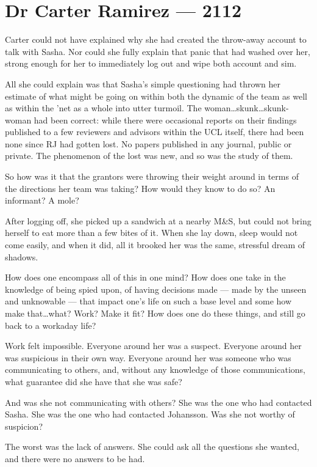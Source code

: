 \hypertarget{dr-carter-ramirez-2112}{%
\chapter*{Dr Carter Ramirez — 2112}\label{dr-carter-ramirez-2112}}

Carter could not have explained why she had created the throw-away account to talk with Sasha. Nor could she fully explain that panic that had washed over her, strong enough for her to immediately log out and wipe both account and sim.

All she could explain was that Sasha's simple questioning had thrown her estimate of what might be going on within both the dynamic of the team as well as within the 'net as a whole into utter turmoil. The woman\ldots{}skunk\ldots{}skunk-woman had been correct: while there were occasional reports on their findings published to a few reviewers and advisors within the UCL itself, there had been none since RJ had gotten lost. No papers published in any journal, public or private. The phenomenon of the lost was new, and so was the study of them.

So how was it that the grantors were throwing their weight around in terms of the directions her team was taking? How would they know to do so? An informant? A mole?

After logging off, she picked up a sandwich at a nearby M\&S, but could not bring herself to eat more than a few bites of it. When she lay down, sleep would not come easily, and when it did, all it brooked her was the same, stressful dream of shadows.

How does one encompass all of this in one mind? How does one take in the knowledge of being spied upon, of having decisions made — made by the unseen and unknowable — that impact one's life on such a base level and some how make that\ldots{}what? Work? Make it fit? How does one do these things, and still go back to a workaday life?

Work felt impossible. Everyone around her was a suspect. Everyone around her was suspicious in their own way. Everyone around her was someone who was communicating to others, and, without any knowledge of those communications, what guarantee did she have that she was safe?

And was she not communicating with others? She was the one who had contacted Sasha. She was the one who had contacted Johansson. Was she not worthy of suspicion?

The worst was the lack of answers. She could ask all the questions she wanted, and there were no answers to be had.

